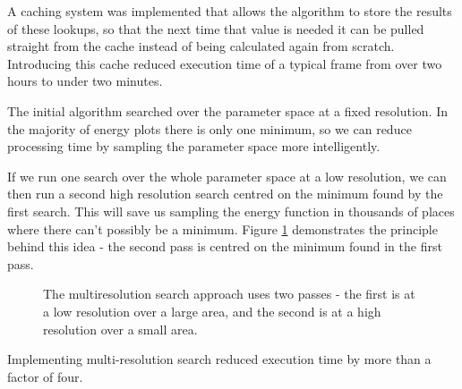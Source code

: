 \documentclass[a4paper,12pt]{article}
\begin{document}
A caching system was implemented that allows the algorithm to store the results of these lookups, so that the next time that value is needed it can be pulled straight from the cache instead of being calculated again from scratch.
Introducing this cache reduced execution time of a typical frame from over two hours to under two minutes.

\bigskip
The initial algorithm searched over the parameter space at a fixed resolution.
In the majority of energy plots there is only one minimum, so we can reduce processing time by sampling the parameter space more intelligently.

If we run one search over the whole parameter space at a low resolution, we can then run a second high resolution search centred on the minimum found by the first search.
This will save us sampling the energy function in thousands of places where there can't possibly be a minimum.
Figure \ref{MultiResImages} demonstrates the principle behind this idea - the second pass is centred on the minimum found in the first pass.

\begin{figure}[bt]
	\centering
	\qquad
	\caption{The multiresolution search approach uses two passes - the first is at a low resolution over a large area,
		and the second is at a high resolution over a small area.}
	\label{MultiResImages}
\end{figure}

Implementing multi-resolution search reduced execution time by more than a factor of four.
\end{document}

